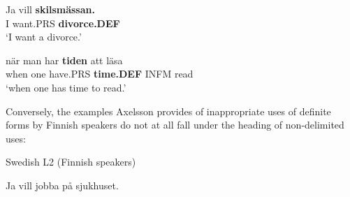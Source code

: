 \z

\item 


 \ea\label{}
\gll Ja  vill  \textbf{skilsmässan.}\\


I  want.PRS  \textbf{divorce.DEF}\\

\glt  ‘I want a divorce.’

\z

\item 


 \ea\label{}
\gll när  man  har  \textbf{tiden} att  läsa  \\


when  one  have.PRS  \textbf{time.DEF} INFM  read  \\

\glt ‘when one has time to read.’

\z

Conversely, the examples Axelsson provides of inappropriate uses of definite forms by Finnish speakers do not at all fall under the heading of non-delimited uses:


\item 

\label{bkm:Ref115686476}Swedish L2 (Finnish speakers)



\item 


 \ea\label{}
\gll Ja  vill  jobba  på  sjukhuset.\\


